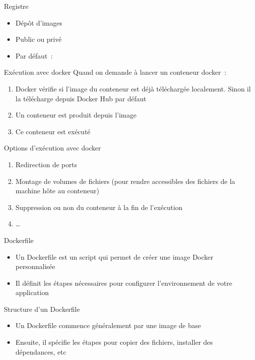 \begin{frame}{Registre}
  \begin{itemize}
    \item Dépôt d'images
    \item Public ou privé
    \item Par défaut~: 
  \end{itemize}
\end{frame}

\begin{frame}{Exécution avec docker}
  Quand on demande à lancer un conteneur docker~:
  \begin{enumerate}
    \item Docker vérifie si l'image du conteneur est déjà téléchargée localement. Sinon il la télécharge depuis Docker Hub par défaut
    \item Un conteneur est produit depuis l'image
    \item Ce conteneur est exécuté
  \end{enumerate}
\end{frame}

\begin{frame}{Options d'exécution avec docker}
  \begin{enumerate}
    \item Redirection de ports
    \item Montage de volumes de fichiers (pour rendre accessibles des fichiers de la machine hôte au conteneur)
    \item Suppression ou non du conteneur à la fin de l'exécution
    \item …
  \end{enumerate}
\end{frame}

\begin{frame}{Dockerfile}
  \begin{itemize}
    \item Un Dockerfile est un script qui permet de créer une image Docker personnalisée
    \item Il définit les étapes nécessaires pour configurer l'environnement de votre application
  \end{itemize}
\end{frame}

\begin{frame}{Structure d'un Dockerfile}
  \begin{itemize}
    \item Un Dockerfile commence généralement par une image de base
    \item Ensuite, il spécifie les étapes pour copier des fichiers, installer des dépendances, etc
  \end{itemize}
\end{frame}

